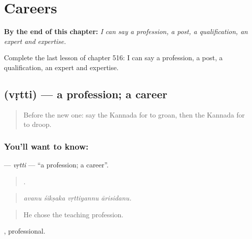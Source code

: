 
\chapter{Careers}
\label{ch:ka-careers}

\begin{chapteropening}
\textbf{By the end of this chapter:} \emph{I can say a profession, a post, a qualification, an expert and expertise.}

Complete the last lesson of chapter 516: I can say a profession, a post, a qualification, an expert and expertise.
\end{chapteropening}

\section[\texorpdfstring{\kn{ವೃತ್ತಿ} (vṛtti)}{ವೃತ್ತಿ (vṛtti)}]{ (vṛtti) — a profession; a career}

\label{lesson:KA-C516-vrtti}



\begin{quote}
Before the new one: say the Kannada for to groan, then the Kannada for to droop.
\end{quote}

\subsection*{You'll want to know: }
\textbf{} — \emph{vṛtti} — \textquotedblleft{}a profession; a career\textquotedblright{}.

\begin{quote}
   .
\end{quote}

\begin{quote}
\emph{avanu śikṣaka vṛttiyannu ārisidanu.}
\end{quote}

\begin{quote}
He chose the teaching profession.
\end{quote}

, professional.

